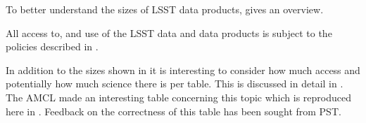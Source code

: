 To better understand the sizes of LSST data products,  gives an overview.



All access to, and use of the LSST data and data products is subject to the policies described in .

In addition to the sizes shown in  it is interesting to consider how much access and potentially how much science
there is per table. This is discussed in detail in . The AMCL made an interesting table concerning this topic
which is reproduced here in . Feedback on the correctness of this table has been sought from PST.

